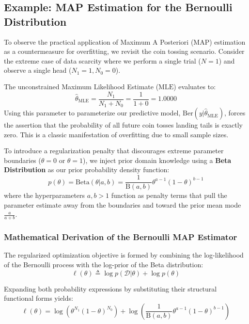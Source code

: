 \documentclass{article}
\begin{document}
\subsection{Example: MAP Estimation for the Bernoulli Distribution}

To observe the practical application of Maximum A Posteriori ($\text{MAP}$) estimation as a countermeasure for overfitting, we revisit the coin tossing scenario. Consider the extreme case of data scarcity where we perform a single trial ($N=1$) and observe a single head ($N_1 = 1, N_0 = 0$).

The unconstrained Maximum Likelihood Estimate ($\text{MLE}$) evaluates to:
\begin{equation}
\hat{\theta}_{\text{MLE}} = \frac{N_1}{N_1 + N_0} = \frac{1}{1 + 0} = \mathbf{1.0000}
\end{equation}
Using this parameter to parameterize our predictive model, $\text{Ber}(y | \hat{\theta}_{\text{MLE}})$, forces the assertion that the probability of all future coin tosses landing tails is exactly zero. This is a classic manifestation of overfitting due to small sample sizes. 

To introduce a regularization penalty that discourages extreme parameter boundaries ($\theta = 0$ or $\theta = 1$), we inject prior domain knowledge using a \textbf{Beta Distribution} as our prior probability density function:
\begin{equation}
p(\theta) = \text{Beta}(\theta | a, b) = \frac{1}{\text{B}(a, b)} \theta^{a - 1} (1 - \theta)^{b - 1}
\end{equation}
where the hyperparameters $a, b > 1$ function as penalty terms that pull the parameter estimate away from the boundaries and toward the prior mean mode $\frac{a}{a+b}$.

\subsubsection{Mathematical Derivation of the Bernoulli MAP Estimator}

The regularized optimization objective is formed by combining the log-likelihood of the Bernoulli process with the log-prior of the Beta distribution:
\begin{equation}
\ell(\theta) \triangleq \log p(\mathcal{D} | \theta) + \log p(\theta)
\end{equation}

Expanding both probability expressions by substituting their structural functional forms yields:
\begin{equation}
\ell(\theta) = \log \left( \theta^{N_1} (1 - \theta)^{N_0} \right) + \log \left( \frac{1}{\text{B}(a, b)} \theta^{a - 1} (1 - \theta)^{b - 1} \right)
\end{equation}
\end{document}

